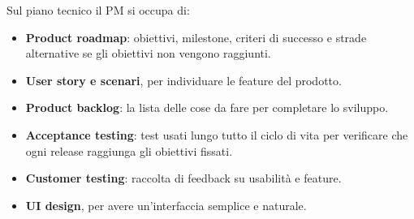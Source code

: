 Sul piano tecnico il PM si occupa di:

\begin{itemize}
\tightlist
\item
  \textbf{Product roadmap}: obiettivi, milestone, criteri di successo e
  strade alternative se gli obiettivi non vengono raggiunti.
\item
  \textbf{User story e scenari}, per individuare le feature del
  prodotto.
\item
  \textbf{Product backlog}: la lista delle cose da fare per completare
  lo sviluppo.
\item
  \textbf{Acceptance testing}: test usati lungo tutto il ciclo di vita
  per verificare che ogni release raggiunga gli obiettivi fissati.
\item
  \textbf{Customer testing}: raccolta di feedback su usabilità e
  feature.
\item
  \textbf{UI design}, per avere un'interfaccia semplice e naturale.
\end{itemize}
